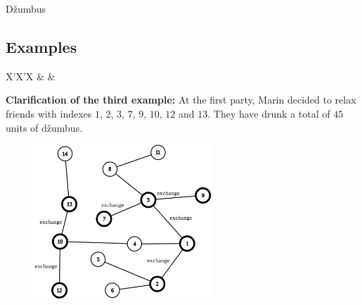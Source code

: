 \begin{statement}[
  problempoints=110,
  timelimit=1 second,
  memorylimit=512 MiB,
]{Džumbus}
\subsection*{Examples}
\begin{tabularx}{\textwidth}{X'X'X}
 &
 &
\end{tabularx}

\textbf{Clarification of the third example:}
At the first party, Marin decided to relax friends with indexes
$1$, $2$, $3$, $7$, $9$, $10$, $12$ and $13$. They have drunk a total
of $45$ units of džumbus.

\setlength\intextsep{-0.5cm}
\begin{figure}
\centering
\includegraphics[width=0.6\textwidth]{img/treeEnglish.png}
\end{figure}

\end{statement}

